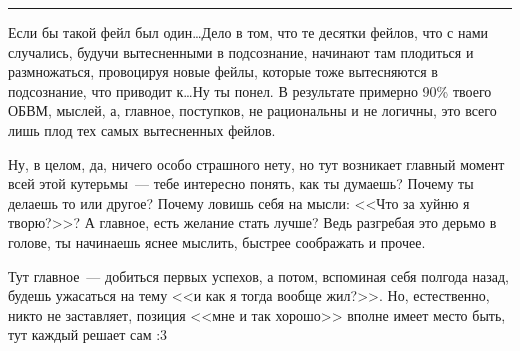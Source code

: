 \documentclass[a5paper,12pt,twoside]{memoir}
\begin{document}
\fancybreak{* * *}

\medskip


\medskip

Если бы такой фейл был один\ldots Дело в том, что те десятки фейлов, что с нами случались, будучи вытесненными в подсознание, начинают там плодиться и размножаться, провоцируя новые фейлы, которые тоже вытесняются в подсознание, что приводит к\ldots Ну ты понел. В результате примерно 90\% твоего ОБВМ, мыслей, а, главное, поступков, не рациональны и не логичны, это всего лишь плод тех самых вытесненных фейлов.
 
\medskip


\medskip

Ну, в целом, да, ничего особо страшного нету, но тут возникает главный момент всей этой кутерьмы~--- тебе интересно понять, как ты думаешь? Почему ты делаешь то или другое? Почему ловишь себя на мысли: <<Что за хуйню я творю?>>? А главное, есть желание стать лучше? Ведь разгребая это дерьмо в голове, ты начинаешь яснее мыслить, быстрее соображать и прочее.
 
Тут главное~--- добиться первых успехов, а потом, вспоминая себя полгода назад, будешь ужасаться на тему <<и как я тогда вообще жил?>>. Но, естественно, никто не заставляет, позиция <<мне и так хорошо>> вполне имеет место быть, тут каждый решает сам :3

\medskip

\end{document}
